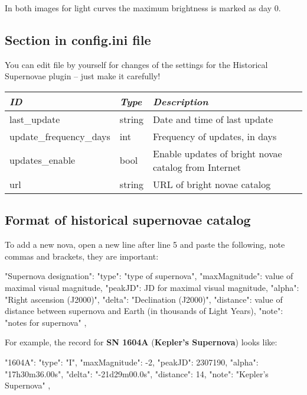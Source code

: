 In both images for light curves the maximum brightness is marked as day 0.

\subsection{Section  in config.ini file}
\label{sec:plugins:HistoricalSupernovae:config}

You can edit  file by yourself for changes of the
settings for the Historical Supernovae plugin -- just make it carefully!

\begin{longtabu} to \textwidth {l|l|X}\toprule
\emph{ID}            & \emph{Type} & \emph{Description}\\\midrule
last\_update            & string & Date and time of last update\\\midrule
update\_frequency\_days & int    & Frequency of updates, in days\\\midrule
updates\_enable         & bool   & Enable updates of bright novae catalog from Internet \\\midrule
url                     & string & URL of bright novae catalog \\\bottomrule
\end{longtabu}

\newpage
\subsection{Format of historical supernovae catalog}
\label{sec:plugins:HistoricalSupernovae:format}

To add a new nova, open a new line after line 5 and paste the following, note commas and brackets, they are important:

\begin{configfile}
"Supernova designation":
{
    "type": "type of supernova",
    "maxMagnitude": value of maximal visual magnitude,
    "peakJD": JD for maximal visual magnitude,
    "alpha": "Right ascension (J2000)",
    "delta": "Declination (J2000)",
    "distance": value of distance between supernova and 
                Earth (in thousands of Light Years),
    "note": "notes for supernova"
},
\end{configfile}

\noindent For example, the record for \textbf{SN 1604A} (\textbf{Kepler's Supernova}) looks like:
\begin{configfile}
"1604A":
{
    "type": "I",
    "maxMagnitude": -2,
    "peakJD": 2307190,
    "alpha": "17h30m36.00s",
    "delta": "-21d29m00.0s",
    "distance": 14,
    "note": "Kepler's Supernova"
},
\end{configfile}

